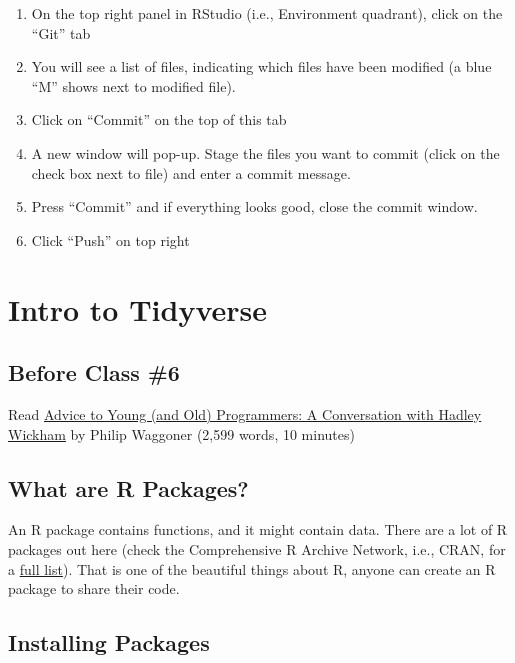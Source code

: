 \documentclass[
]{book}
\begin{document}
\begin{enumerate}
\def\labelenumi{\arabic{enumi}.}
\item
  On the top right panel in RStudio (i.e., Environment quadrant), click on the ``Git'' tab
\item
  You will see a list of files, indicating which files have been modified (a blue ``M'' shows next to modified file).
\item
  Click on ``Commit'' on the top of this tab
\item
  A new window will pop-up. Stage the files you want to commit (click on the check box next to file) and enter a commit message.
\item
  Press ``Commit'' and if everything looks good, close the commit window.
\item
  Click ``Push'' on top right
\end{enumerate}

\hypertarget{intro-to-tidyverse}{%
\chapter{Intro to Tidyverse}\label{intro-to-tidyverse}}

\hypertarget{before-class-6}{%
\section{Before Class \#6}\label{before-class-6}}

Read \href{https://www.r-bloggers.com/advice-to-young-and-old-programmers-a-conversation-with-hadley-wickham/}{Advice to Young (and Old) Programmers: A Conversation with Hadley Wickham} by Philip Waggoner (2,599 words, 10 minutes)

\hypertarget{what-are-r-packages}{%
\section{What are R Packages?}\label{what-are-r-packages}}

An R package contains functions, and it might contain data. There are a lot of R packages out here (check the Comprehensive R Archive Network, i.e., CRAN, for a \href{https://cran.r-project.org/web/packages/available_packages_by_name.html}{full list}). That is one of the beautiful things about R, anyone can create an R package to share their code.

\hypertarget{installing-packages}{%
\section{Installing Packages}\label{installing-packages}}
\end{document}
